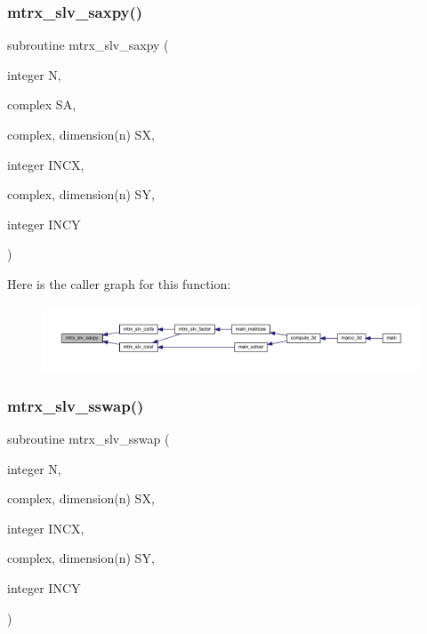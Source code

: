 \subsubsection{\texorpdfstring{mtrx\+\_\+slv\+\_\+saxpy()}{mtrx\_slv\_saxpy()}}
{\footnotesize\ttfamily subroutine mtrx\+\_\+slv\+\_\+saxpy (\begin{DoxyParamCaption}\item[{integer}]{N,  }\item[{complex}]{SA,  }\item[{complex, dimension(n)}]{SX,  }\item[{integer}]{I\+N\+CX,  }\item[{complex, dimension(n)}]{SY,  }\item[{integer}]{I\+N\+CY }\end{DoxyParamCaption})}

Here is the caller graph for this function\+:
\nopagebreak
\begin{figure}[H]
\begin{center}
\leavevmode
\includegraphics[width=350pt]{Marco_8f90_a3087d74c0491a5f5b127e78d96b7df0c_icgraph}
\end{center}
\end{figure}
\mbox{\label{Marco_8f90_a41de629eee6c3a88f303346f2fe77e42}} 
\subsubsection{\texorpdfstring{mtrx\+\_\+slv\+\_\+sswap()}{mtrx\_slv\_sswap()}}
{\footnotesize\ttfamily subroutine mtrx\+\_\+slv\+\_\+sswap (\begin{DoxyParamCaption}\item[{integer}]{N,  }\item[{complex, dimension(n)}]{SX,  }\item[{integer}]{I\+N\+CX,  }\item[{complex, dimension(n)}]{SY,  }\item[{integer}]{I\+N\+CY }\end{DoxyParamCaption})}

